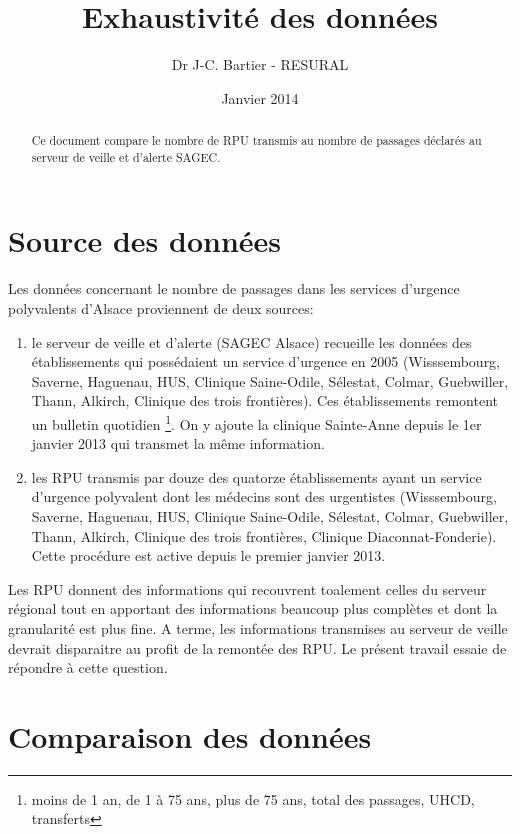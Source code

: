 \documentclass{article}\usepackage[]{graphicx}\usepackage[]{color}
\title{Exhaustivité des données}
\author{Dr J-C. Bartier - RESURAL}
\date{Janvier 2014}
\begin{document}
\maketitle
\begin{abstract}
Ce document compare le nombre de RPU transmis au nombre de passages déclarés au serveur de veille et d'alerte SAGEC.
\end{abstract}




\section{Source des données}

Les données concernant le nombre de passages dans les services d'urgence polyvalents d'Alsace proviennent de deux sources:
\begin{enumerate}
  \item le serveur de veille et d'alerte (SAGEC Alsace) recueille les données des établissements qui possédaient un service d'urgence en 2005 (Wisssembourg, Saverne, Haguenau, HUS, Clinique Saine-Odile, Sélestat, Colmar, Guebwiller, Thann, Alkirch, Clinique des trois frontières). Ces établissements remontent un bulletin quotidien \footnote{moins de 1 an, de 1 à 75 ans, plus de 75 ans, total des passages, UHCD, transferts}. On y ajoute la clinique Sainte-Anne depuis le 1er janvier 2013 qui transmet la même information.
  \item les RPU transmis par douze des quatorze établissements ayant un service d'urgence polyvalent dont les médecins sont des urgentistes (Wisssembourg, Saverne, Haguenau, HUS, Clinique Saine-Odile, Sélestat, Colmar, Guebwiller, Thann, Alkirch, Clinique des trois frontières, Clinique Diaconnat-Fonderie). Cette procédure est active depuis le premier janvier 2013.
\end{enumerate}

Les RPU donnent des informations qui recouvrent toalement celles du serveur régional tout en apportant des informations beaucoup plus complètes et dont la granularité est plus fine. A terme, les informations transmises au serveur de veille devrait disparaitre au profit de la remontée des RPU. Le présent travail essaie de répondre à cette question.

\section{Comparaison des données}
\end{document}
